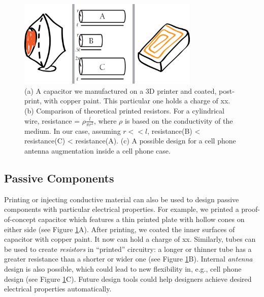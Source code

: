 \begin{figure}[h]
\centering
    \includegraphics[width=3.4in]{figures/electronics.png}
\caption{(a) A capacitor we manufactured on a 3D printer and coated, post-print, with copper paint.  This particular one holds a charge of xx.  (b) Comparison of theoretical printed resistors.  For a cylindrical wire, resistance = $\rho\frac{l}{\pi r^2}$, where $\rho$ is based on the conductivity of the medium.  In our case, assuming $ r << l$, resistance(B) < resistance(C) < resistance(A).  (c) A possible design for a cell phone antenna augmentation inside a cell phone case. }
\label{fig:electronics}
\end{figure}

\subsection{Passive Components}

Printing or injecting conductive material can also be used to design passive components with particular electrical properties. For example, we printed a proof-of-concept  capacitor which features a thin printed plate with hollow cones on either side (see Figure \ref{fig:electronics}A).  After printing, we coated the inner surfaces of capacitor with copper paint.  It now can hold a charge of xx.  Similarly, tubes can be used to create \emph{resistors} in ``printed'' circuitry: a longer or thinner tube has a greater resistance than a shorter or wider one (see Figure \ref{fig:electronics}B).  Internal \emph{antenna} design is also possible, which could lead to new flexibility in, e.g., cell phone design (see Figure \ref{fig:electronics}C). Future design tools could help designers achieve desired electrical properties automatically.

